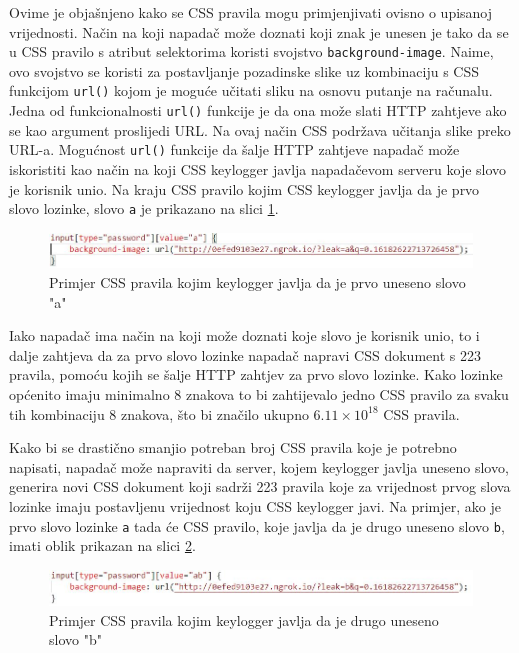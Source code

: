 \documentclass[12pt, oneside, onecolumn]{book}
\begin{document}
{Ovime je objašnjeno kako se CSS pravila mogu primjenjivati ovisno o upisanoj vrijednosti. Način na koji napadač može doznati koji znak je unesen je tako da se u CSS pravilo s atribut selektorima koristi svojstvo \texttt{background-image}. Naime, ovo svojstvo se koristi za postavljanje pozadinske slike uz kombinaciju s CSS funkcijom \texttt{url()} kojom je moguće učitati sliku na osnovu putanje na računalu. Jedna od funkcionalnosti \texttt{url()} funkcije je da ona može slati HTTP zahtjeve ako se kao argument proslijedi URL. Na ovaj način CSS podržava učitanja slike preko URL-a. Mogućnost \texttt{url()} funkcije da šalje HTTP zahtjeve napadač može iskoristiti kao način na koji CSS keylogger javlja napadačevom serveru koje slovo je korisnik unio. Na kraju CSS pravilo kojim CSS keylogger javlja da je prvo slovo lozinke, slovo \texttt{a} je prikazano na slici \ref{fig:css_rule}.

\begin{figure}[H]
	\begin{center}
		\includegraphics[width=\textwidth]{css_rule.jpg}
		\caption{Primjer CSS pravila kojim keylogger javlja da je prvo uneseno slovo "a"} \label{fig:css_rule}
	\end{center}
\end{figure}

Iako napadač ima način na koji može doznati koje slovo je korisnik unio, to i dalje zahtjeva da za prvo slovo lozinke napadač napravi CSS dokument s 223 pravila, pomoću kojih se šalje HTTP zahtjev za prvo slovo lozinke. Kako lozinke općenito imaju minimalno 8 znakova to bi zahtijevalo jedno CSS pravilo za svaku tih kombinaciju 8 znakova, što bi značilo ukupno \(6.11 \times 10^{18}\) CSS pravila.

Kako bi se drastično smanjio potreban broj CSS pravila koje je potrebno napisati, napadač može napraviti da server, kojem keylogger javlja uneseno slovo, generira novi CSS dokument koji sadrži 223 pravila koje za vrijednost prvog slova lozinke imaju postavljenu vrijednost koju CSS keylogger javi. Na primjer, ako je prvo slovo lozinke \texttt{a} tada će CSS pravilo, koje javlja da je drugo uneseno slovo \texttt{b}, imati oblik prikazan na slici \ref{fig:css_sl}.

\begin{figure}[H]
	\begin{center}
		\includegraphics[width=\textwidth]{css_sl.jpg}
		\caption{Primjer CSS pravila kojim keylogger javlja da je drugo uneseno slovo "b"} \label{fig:css_sl}
	\end{center}
\end{figure}

}
\end{document}
